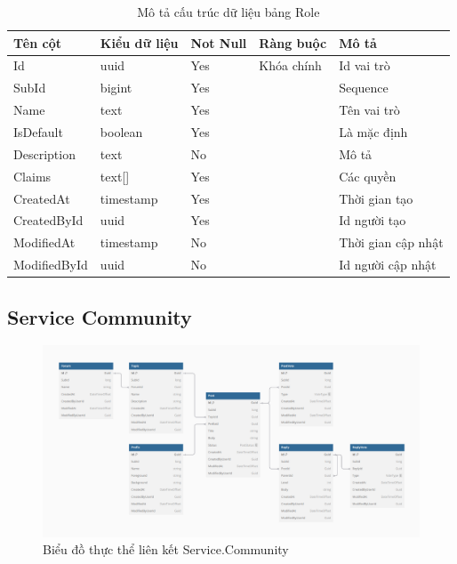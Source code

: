 \documentclass[../index.tex]{subfiles}
\begin{document}
    \begin{table}[H]
        \begin{tabular}{ |p{3cm}|p{2.5cm}|p{1.6cm}|p{2.2cm}|p{3cm}| }
            \hline
            Tên cột      & Kiểu dữ liệu             & Not Null & Ràng buộc  & Mô tả              \\
            \hline
            Id           & uuid                     & Yes      & Khóa chính & Id vai trò         \\
            \hline
            SubId        & bigint                   & Yes      &            & Sequence           \\
            \hline
            Name         & text    & Yes      &            & Tên vai trò        \\
            \hline
            IsDefault    & boolean                  & Yes      &            & Là mặc định        \\
            \hline
            Description  & text   & No       &            & Mô tả              \\
            \hline
            Claims       & text[]                   & Yes      &            & Các quyền          \\
            \hline
            CreatedAt    & timestamp & Yes      &            & Thời gian tạo      \\
            \hline
            CreatedById  & uuid                     & Yes      &            & Id người tạo       \\
            \hline
            ModifiedAt   & timestamp & No       &            & Thời gian cập nhật \\
            \hline
            ModifiedById & uuid                     & No       &            & Id người cập nhật  \\
            \hline
        \end{tabular}
        \caption{Mô tả cấu trúc dữ liệu bảng Role}
    \end{table}

    \subsection{Service Community}
    \begin{figure}[H]
        \centering
        \includegraphics[width=0.85\linewidth]{
            ../figures/service-community_erd.png
        }
        \caption{Biểu đồ thực thể liên kết Service.Community}
        \label{fig:service-community-erd}
    \end{figure}
\end{document}
